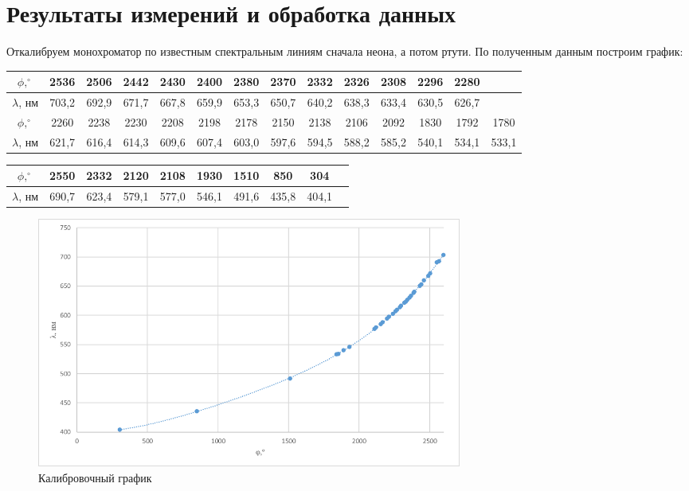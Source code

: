 \documentclass[12pt,a4paper]{article}
\begin{document}
\section{Результаты измерений и обработка данных}

Откалибруем монохроматор по известным спектральным линиям сначала неона, а потом ртути. По полученным данным построим график:

\begin{center}
\begin{tabular}{|c|c|c|c|c|c|c|c|c|c|c|c|c|c|}
\hline 
$\phi, ^\circ$ & 2536 & 2506 & 2442 & 2430 & 2400 & 2380 & 2370 & 2332 & 2326 & 2308 & 2296 & 2280  \\ 
\hline 
$\lambda$, нм & 703,2 & 692,9 & 671,7 & 667,8 & 659,9 & 653,3 & 650,7 & 640,2 & 638,3 & 633,4 & 630,5 & 626,7 \\ 
\hline 
$\phi, ^\circ$ & 2260 & 2238 & 2230 & 2208 & 2198 & 2178 & 2150 & 2138 & 2106 & 2092 & 1830 & 1792 & 1780 \\ 
\hline
$\lambda$, нм & 621,7 & 616,4 & 614,3 & 609,6 & 607,4 & 603,0 & 597,6 & 594,5 & 588,2 & 585,2 & 540,1 & 534,1 & 533,1  \\
\hline
\end{tabular} 
\end{center}

\begin{center}
\begin{tabular}{|c|c|c|c|c|c|c|c|c|c|}
\hline 
$\phi, ^\circ$ & 2550 & 2332 & 2120 & 2108 & 1930 & 1510 & 850 &  304   \\ 
\hline 
$\lambda$, нм & 690,7 & 623,4 & 579,1 & 577,0 & 546,1 & 491,6 & 435,8 & 404,1  \\ 
\hline 

\end{tabular} 
\end{center}

\begin{figure}[H]
	\begin{center}
		\includegraphics[width=14cm]{5.2.2-1}
		\caption{Калибровочный график}
	\end{center}
\end{figure}
\end{document}
